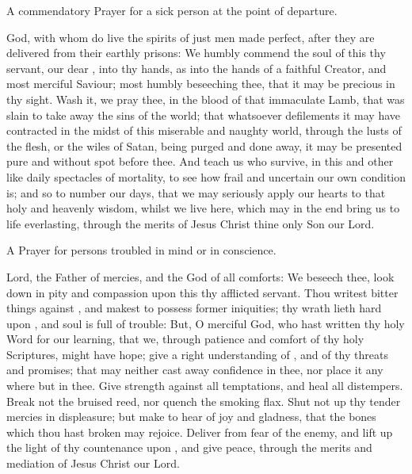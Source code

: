 \begin{rubric}
A commendatory Prayer for a sick person at the point of departure.
\end{rubric}

 God, with whom do live the spirits of just men made perfect, after they are delivered from their earthly prisons: We humbly commend the soul of this thy servant, our dear , into thy hands, as into the hands of a faithful Creator, and most merciful Saviour; most humbly beseeching thee, that it may be precious in thy sight.
Wash it, we pray thee, in the blood of that immaculate Lamb, that was slain to take away the sins of the world; that whatsoever defilements it may have contracted in the midst of this miserable and naughty world, through the lusts of the flesh, or the wiles of Satan, being purged and done away, it may be presented pure and without spot before thee.
And teach us who survive, in this and other like daily spectacles of mortality, to see how frail and uncertain our own condition is; and so to number our days, that we may seriously apply our hearts to that holy and heavenly wisdom, whilst we live here, which may in the end bring us to life everlasting, through the merits of Jesus Christ thine only Son our Lord.

\newpage

\begin{rubric}
A Prayer for persons troubled in mind or in conscience.
\end{rubric}

 Lord, the Father of mercies, and the God of all comforts: We beseech thee, look down in pity and compassion upon this thy afflicted servant.
Thou writest bitter things against , and makest  to possess  former iniquities; thy wrath lieth hard upon , and  soul is full of trouble:
But, O merciful God, who hast written thy holy Word for our learning, that we, through patience and comfort of thy holy Scriptures, might have hope;
give  a right understanding of , and of thy threats and promises; that  may neither cast away  confidence in thee, nor place it any where but in thee.
Give  strength against all  temptations, and heal all  distempers.
Break not the bruised reed, nor quench the smoking flax.
Shut not up thy tender mercies in displeasure; but make  to hear of joy and gladness, that the bones which thou hast broken may rejoice.
Deliver  from fear of the enemy, and lift up the light of thy countenance upon , and give  peace, through the merits and mediation of Jesus Christ our Lord.
